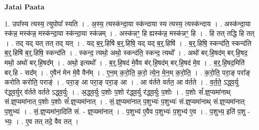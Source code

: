 \documentclass[17pt]{extarticle}
\begin{document}
\textbf{Jatai Paata} \newline

1. उपा᳚स्य त्यस्य॒ त्युपोपा᳚ स्यति । . अ॒स्य॒ त्यस्क॑न्दा॒या स्क॑न्दाया स्य त्यस्य॒ त्यस्क॑न्दाय । . अस्क॑न्दा॒या स्क॑न्न॒ मस्क॑न्न॒ मस्क॑न्दा॒या स्क॑न्दा॒या स्क॑न्नम् । . अस्क॑न्नꣳ॒॒ हि ह्यस्क॑न्न॒ मस्क॑न्नꣳ॒॒ हि । . हि तत् तद्धि हि तत् । . तद् यद् यत् तत् तद् यत् । . यद् ब॒र्॒.हिषि॑ ब॒र्॒.हिषि॒ यद् यद् ब॒र्॒.हिषि॑ । . ब॒र्॒.हिषि॒ स्कन्द॑ति॒ स्कन्द॑ति ब॒र्॒.हिषि॑ ब॒र्॒.हिषि॒ स्कन्द॑ति । . स्कन्द॒ त्यथो॒ अथो॒ स्कन्द॑ति॒ स्कन्द॒ त्यथो᳚ । . अथो॑ बर्.हि॒षद॑म् बर्.हि॒षद॒ मथो॒ अथो॑ बर्.हि॒षद᳚म् । . अथो॒ इत्यथो᳚ । . ब॒र्॒.हि॒षद॑ मे॒वैव ब॑र्.हि॒षद॑म् बर्.हि॒षद॑ मे॒व । . ब॒र्॒.हि॒षद॒मिति॑ बर्.हि - सद᳚म् । . ए॒वैन॑ मेन मे॒वै वैन᳚म् । . ए॒न॒म् क॒रो॒ति॒ क॒रो॒ त्ये॒न॒ मे॒न॒म् क॒रो॒ति॒ । . क॒रो॒ति॒ परा॒ङ् परा᳚ङ् करोति करोति॒ पराङ्॑ । . परा॒ङ् आ परा॒ङ् परा॒ङ् आ । . आ व॑र्तते वर्तत॒ आ व॑र्तते । . व॒र्त॒ते॒ ऽद्ध्व॒र्यु र॑द्ध्व॒र्युर् व॑र्तते वर्तते ऽद्ध्व॒र्युः । . अ॒द्ध्व॒र्युः प॒शोः प॒शो र॑द्ध्व॒र्यु र॑द्ध्व॒र्युः प॒शोः । . प॒शोः सं᳚.ज्ञ्॒प्यमा॑नाथ् सं.ज्ञ्॒प्यमा॑नात् प॒शोः प॒शोः सं᳚.ज्ञ्॒प्यमा॑नात् । . सं॒.ज्ञ्॒प्यमा॑नात् प॒शुभ्यः॑ प॒शुभ्यः॑ सं.ज्ञ्॒प्यमा॑नाथ् सं.ज्ञ्॒प्यमा॑नात् प॒शुभ्यः॑ । . सं॒.ज्ञ्॒प्यमा॑ना॒दिति॑ सं. - ज्ञ्॒प्यमा॑नात् । . प॒शुभ्य॑ ए॒वैव प॒शुभ्यः॑ प॒शुभ्य॑ ए॒व । . प॒शुभ्य॒ इति॑ प॒शु - भ्यः॒ । . ए॒व तत् तदे॒ वैव तत् । \newline
\end{document}
